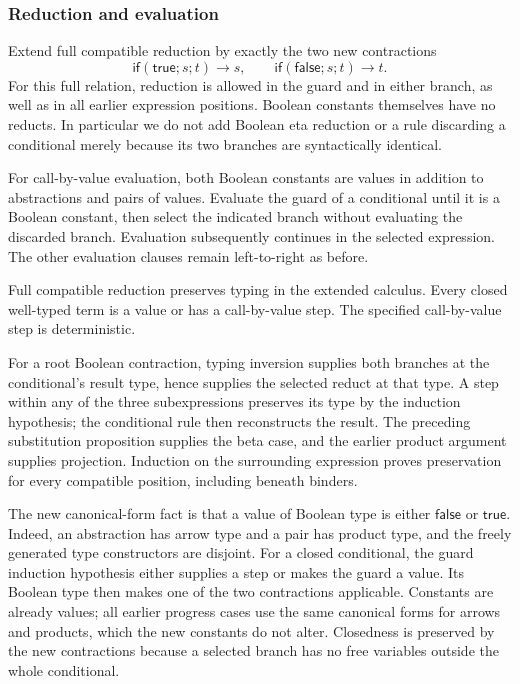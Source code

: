 \subsubsection{Reduction and evaluation}
Extend full compatible reduction by exactly the two new contractions
\[
\mathsf{if}(\mathsf{true};s;t)\longrightarrow s,\qquad
\mathsf{if}(\mathsf{false};s;t)\longrightarrow t.
\]
For this full relation, reduction is allowed in the guard and in either
branch, as well as in all earlier expression positions. Boolean
constants themselves have no reducts. In particular we do not add
Boolean eta reduction or a rule discarding a conditional merely because
its two branches are syntactically identical.

For call-by-value evaluation, both Boolean constants are values in
addition to abstractions and pairs of values. Evaluate the guard of a
conditional until it is a Boolean constant, then select the indicated
branch without evaluating the discarded branch. Evaluation subsequently
continues in the selected expression. The other evaluation clauses
remain left-to-right as before.

\begin{theorem}
Full compatible reduction preserves typing in the extended calculus.
Every closed well-typed term is a value or has a call-by-value step.
The specified call-by-value step is deterministic.
\end{theorem}
\Proof
For a root Boolean contraction, typing inversion supplies both branches
at the conditional's result type, hence supplies the selected reduct
at that type. A step within any of the three subexpressions preserves
its type by the induction hypothesis; the conditional rule then
reconstructs the result. The preceding substitution proposition
supplies the beta case, and the earlier product argument supplies
projection. Induction on the surrounding expression proves preservation
for every compatible position, including beneath binders.

The new canonical-form fact is that a value of Boolean type is either
$\mathsf{false}$ or $\mathsf{true}$. Indeed, an abstraction has arrow
type and a pair has product type, and the freely generated type
constructors are disjoint. For a closed conditional, the guard induction
hypothesis either supplies a step or makes the guard a value. Its
Boolean type then makes one of the two contractions applicable.
Constants are already values; all earlier progress cases use the same
canonical forms for arrows and products, which the new constants do
not alter. Closedness is preserved by the new contractions because a
selected branch has no free variables outside the whole conditional.

